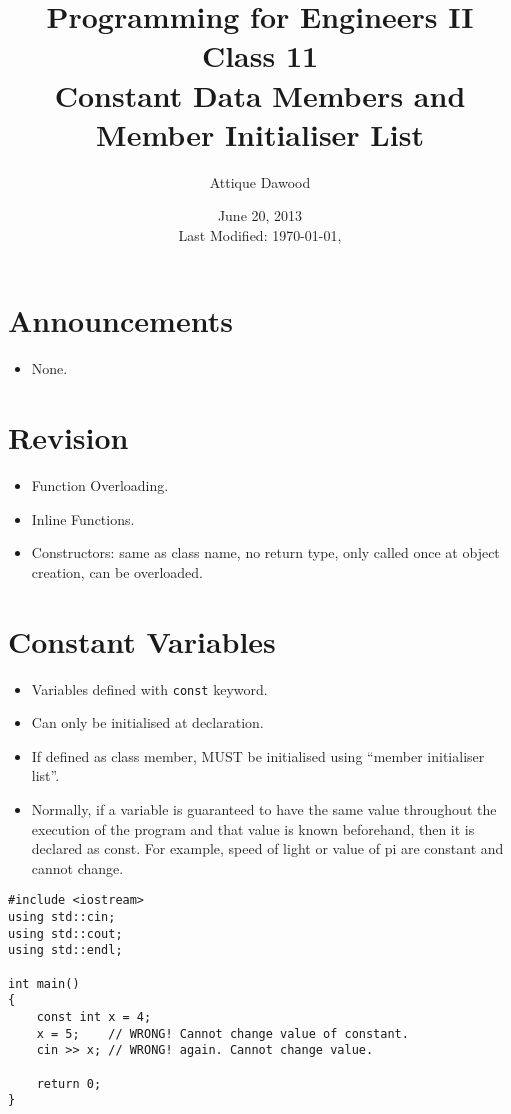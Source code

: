 \documentclass[12pt,a4paper]{article}
\title{\vspace{-2cm}Programming for Engineers II\\Class 11\\Constant Data Members and Member Initialiser List}
\author{Attique Dawood}
\date{June 20, 2013\\[0.2cm] Last Modified: \today, \currenttime}
\begin{document}
\maketitle
\section{Announcements}
\begin{itemize}
\item None.
\end{itemize}
\section{Revision}
\begin{itemize}
\item Function Overloading.
\item Inline Functions.
\item Constructors: same as class name, no return type, only called once at object creation, can be overloaded.
\end{itemize}
\section{Constant Variables}
\begin{itemize}
\item Variables defined with \verb|const| keyword.
\item Can only be initialised at declaration.
\item If defined as class member, MUST be initialised using ``member initialiser list''.
\item Normally, if a variable is guaranteed to have the same value throughout the execution of the program and that value is known beforehand, then it is declared as const. For example, speed of light or value of pi are constant and cannot change.
\end{itemize}
\begin{lstlisting}[caption={const variable}]
#include <iostream>
using std::cin;
using std::cout;
using std::endl;

int main()
{
	const int x = 4;
	x = 5;    // WRONG! Cannot change value of constant.
	cin >> x; // WRONG! again. Cannot change value.
	
	return 0;
}
\end{lstlisting}
\end{document}
